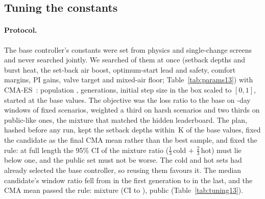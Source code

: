 \subsection{Tuning the constants}
\label{sec:tuning}

\paragraph{Protocol.} The base controller's constants were set from physics and single-change screens and never searched jointly. We searched \RTwNParams{} of them at once (setback depths and burst heat, the set-back air boost, optimum-start lead and safety, comfort margins, PI gains, valve target and mixed-air floor; Table~\ref{tab:params13}) with CMA-ES~\citep{hansen2016cma}: population \RTwPop, \RTwGens{} generations, initial step size \RTwSigmaZero{} in the box scaled to $[0,1]$, started at the base values. The objective was the loss ratio to the base on \RTwWinDays-day windows of \RTwNWin{} fixed scenarios, weighted a third on \RTwNWinHarsh{} harsh scenarios and two thirds on \RTwNWinPub{} public-like ones, the mixture that matched the hidden leaderboard. The plan, hashed before any run, kept the setback depths within \RTwDepthMaxDeeper\,K of the base values, fixed the candidate as the final CMA mean rather than the best sample, and fixed the rule: at full length the 95\% CI of the mixture ratio ($\tfrac13$\,cold $+$ $\tfrac23$\,hot) must lie below one, and the public set must not be worse. The cold and hot sets had already selected the base controller, so reusing them favours it. The median candidate's window ratio fell from \RTwMedFirst{} in the first generation to \RTwMedLast{} in the last, and the CMA mean passed the rule: mixture \RTwCandMix{} (CI \RTwCandMixLo{} to \RTwCandMixHi), public \RTwCandPub{} (Table~\ref{tab:tuning13}).

